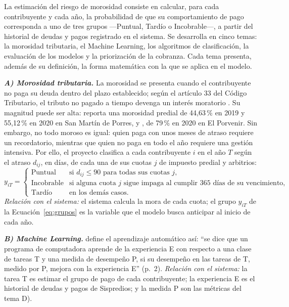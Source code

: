 \documentclass[12pt,a4paper]{report}
\begin{document}
La estimación del riesgo de morosidad consiste en calcular, para cada contribuyente y cada año, la probabilidad de que su comportamiento de pago corresponda a uno de tres grupos ---Puntual, Tardío o Incobrable---, a partir del historial de deudas y pagos registrado en el sistema. Se desarrolla en cinco temas: la morosidad tributaria, el Machine Learning, los algoritmos de clasificación, la evaluación de los modelos y la priorización de la cobranza. Cada tema presenta, además de su definición, la forma matemática con la que se aplica en el modelo.

\noindent\textbf{\textit{A) Morosidad tributaria.}} La morosidad se presenta cuando el contribuyente no paga su deuda dentro del plazo establecido; según el artículo 33 del Código Tributario, el tributo no pagado a tiempo devenga un interés moratorio \parencite{codigotributario}. Su magnitud puede ser alta: \textcite{paredes2022} reporta una morosidad predial de 44,63\,\% en 2019 y 55,12\,\% en 2020 en San Martín de Porres, y \textcite{riosvelasquez2022}, de 79\,\% en 2020 en El Porvenir. Sin embargo, no todo moroso es igual: quien paga con unos meses de atraso requiere un recordatorio, mientras que quien no paga en todo el año requiere una gestión intensiva. Por ello, el proyecto clasifica a cada contribuyente $i$ en el año $T$ según el atraso $d_{ij}$, en días, de cada una de sus cuotas $j$ de impuesto predial y arbitrios:
\begin{equation}
y_{iT}=\begin{cases}
\text{Puntual} & \text{si } d_{ij}\le 90 \text{ para todas sus cuotas } j,\\
\text{Incobrable} & \text{si alguna cuota } j \text{ sigue impaga al cumplir } 365 \text{ días de su vencimiento},\\
\text{Tardío} & \text{en los demás casos.}
\end{cases}
\label{eq:grupos}
\end{equation}
\textit{Relación con el sistema:} el sistema calcula la mora de cada cuota; el grupo $y_{iT}$ de la Ecuación~\eqref{eq:grupos} es la variable que el modelo busca anticipar al inicio de cada año.

\noindent\textbf{\textit{B) Machine Learning.}} \textcite{mitchell1997} define el aprendizaje automático así: ``se dice que un programa de computadora aprende de la experiencia E con respecto a una clase de tareas T y una medida de desempeño P, si su desempeño en las tareas de T, medido por P, mejora con la experiencia E'' (p.~2). \textit{Relación con el sistema:} la tarea T es estimar el grupo de pago de cada contribuyente; la experiencia E es el historial de deudas y pagos de Sispredios; y la medida P son las métricas del tema D).
\end{document}

